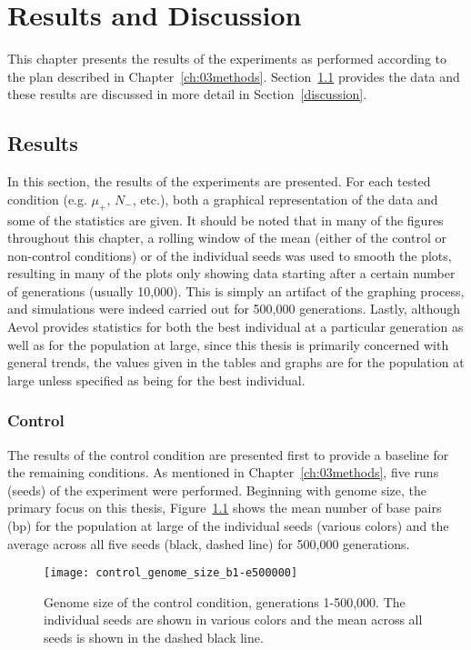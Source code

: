 \chapter{Results and Discussion}\label{ch:04results_discussion}

This chapter presents the results of the experiments as performed according to the plan described in Chapter~\ref{ch:03methods}. Section~\ref{results} provides the data and these results are discussed in more detail in Section~\ref{discussion}. 

\section{Results}\label{results}
In this section, the results of the experiments are presented. For each tested condition (e.g. $\mu_+$, $N_-$, etc.), both a graphical representation of the data and some of the statistics are given. It should be noted that in many of the figures throughout this chapter, a rolling window of the mean (either of the control or non-control conditions) or of the individual seeds was used to smooth the plots, resulting in many of the plots only showing data starting after a certain number of generations (usually 10,000). This is simply an artifact of the graphing process, and simulations were indeed carried out for 500,000 generations. Lastly, although Aevol provides statistics for both the best individual at a particular generation as well as for the population at large, since this thesis is primarily concerned with general trends, the values given in the tables and graphs are for the population at large unless specified as being for the best individual. 
\subsection{Control}
The results of the control condition are presented first to provide a baseline for the remaining conditions. As mentioned in Chapter~\ref{ch:03methods}, five runs (seeds) of the experiment were performed. Beginning with genome size, the primary focus on this thesis, Figure~\ref{fig:control_genome_size} shows the mean number of base pairs (bp) for the population at large of the individual seeds (various colors) and the average across all five seeds (black, dashed line) for 500,000 generations. 

\begin{figure}[H]
	\centering
	\texttt{[image: control\_genome\_size\_b1-e500000]}
	\caption[Control genome size, all seeds]{Genome size of the control condition, generations 1-500,000. The individual seeds are shown in various colors and the mean across all seeds is shown in the dashed black line.}
	\label{fig:control_genome_size}
\end{figure}

